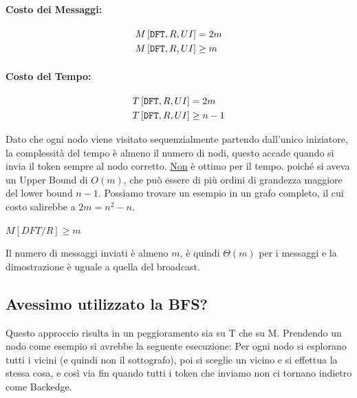 \paragraph{Costo dei Messaggi:}

\begin{equation*}
    \begin{split}
        M\left[\text{\texttt{DFT}}, R, UI\right] & = 2m\\
        M\left[\text{\texttt{DFT}}, R, UI\right] & \geq m
    \end{split}
\end{equation*}

\paragraph{Costo del Tempo:}

\begin{equation*}
    \begin{split}
        T\left[\text{\texttt{DFT}}, R, UI\right] & = 2m\\
        T\left[\text{\texttt{DFT}}, R, UI\right] & \geq n-1
    \end{split}
\end{equation*}

Dato che ogni nodo viene visitato sequenzialmente partendo dall'unico
iniziatore, la complessità del tempo è almeno il numero di nodi, questo accade
quando si invia il token sempre al nodo corretto. \underline{Non} è ottimo per
il tempo. poiché si aveva un Upper Bound di $O(m)$, che può essere di più ordini
di grandezza maggiore del lower bound $n-1$. Possiamo trovare un esempio in un
grafo completo, il cui costo salirebbe a $2m=n^2-n$.

\begin{center}
    $M[DFT/R] \geq m$
\end{center}
Il numero di messaggi inviati è almeno $m$, è quindi $\Theta(m)$ per i messaggi
e la dimostrazione è uguale a quella del broadcast.

\subsection{Avessimo utilizzato la BFS?}
Questo approccio risulta in un peggioramento sia su T che su M. Prendendo un
nodo come esempio si avrebbe la seguente esecuzione: Per ogni nodo si esplorano
tutti i vicini (e quindi non il sottografo), poi si sceglie un vicino e si
effettua la stessa cosa, e così via fin quando tutti i token che inviamo non ci
tornano indietro come Backedge.

